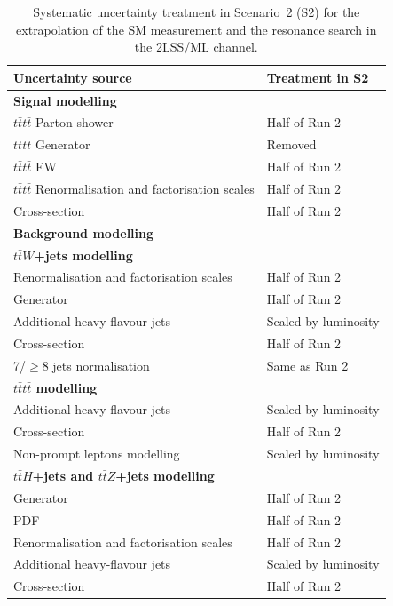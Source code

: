 \begin{table}[htbp]
\centering
\caption{Systematic uncertainty treatment in Scenario~2 (S2) for the extrapolation of the SM \ttttsym{} measurement and the resonance search in the 2LSS/ML channel.}
\label{tab:HL_syst_2LSS}

\begin{tabular}{p{} p{}}
\toprule
\textbf{Uncertainty source} & \textbf{Treatment in S2} \\
\midrule

\multicolumn{2}{l}{\textbf{Signal modelling}} \\
$t\bar{t}t\bar{t}$ Parton shower & Half of Run 2 \\
$t\bar{t}t\bar{t}$ Generator & Removed \\
$t\bar{t}t\bar{t}$ EW & Half of Run 2 \\
$t\bar{t}t\bar{t}$ Renormalisation and factorisation scales & Half of Run 2 \\
Cross-section & Half of Run 2 \\
\midrule

\multicolumn{2}{l}{\textbf{Background modelling}} \\
\multicolumn{2}{l}{\textbf{\boldmath $t\bar{t}W$+jets modelling}} \\
Renormalisation and factorisation scales & Half of Run 2 \\
Generator & Half of Run 2 \\
Additional heavy-flavour jets & Scaled by luminosity \\
Cross-section & Half of Run 2 \\
7/$\geq$8 jets normalisation & Same as Run 2 \\

\multicolumn{2}{l}{\textbf{\boldmath $t\bar{t}t\bar{t}$ modelling}} \\
Additional heavy-flavour jets & Scaled by luminosity \\
Cross-section & Half of Run 2 \\
Non-prompt leptons modelling & Scaled by luminosity \\

\multicolumn{2}{l}{\textbf{\boldmath $t\bar{t}H$+jets and $t\bar{t}Z$+jets modelling}} \\
Generator & Half of Run 2 \\
PDF & Half of Run 2 \\
Renormalisation and factorisation scales & Half of Run 2 \\
Additional heavy-flavour jets & Scaled by luminosity \\
Cross-section & Half of Run 2 \\


\end{tabular}
\end{table}
